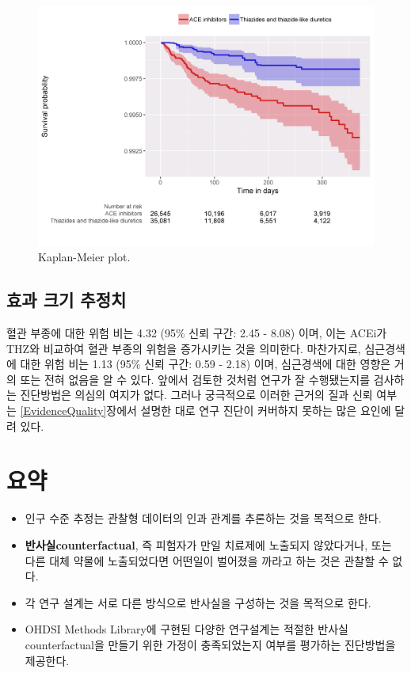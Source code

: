 \documentclass[10.5pt]{book}
\theoremstyle{definition}
\theoremstyle{definition}
\theoremstyle{definition}
\theoremstyle{remark}
\let\BeginKnitrBlock\begin \let\EndKnitrBlock\end
\begin{document}
\begin{figure}

{\centering \includegraphics[width=1\linewidth]{images/PopulationLevelEstimation/kmPlot} 

}

\caption{Kaplan-Meier plot.}\label{fig:kmPlot}
\end{figure}

\subsection{효과 크기 추정치}\label{--}

혈관 부종에 대한 위험 비는 4.32 (95\% 신뢰 구간: 2.45 - 8.08) 이며, 이는
ACEi가 THZ와 비교하여 혈관 부종의 위험을 증가시키는 것을 의미한다.
마찬가지로, 심근경색에 대한 위험 비는 1.13 (95\% 신뢰 구간: 0.59 - 2.18)
이며, 심근경색에 대한 영향은 거의 또는 전혀 없음을 알 수 있다. 앞에서
검토한 것처럼 연구가 잘 수행됐는지를 검사하는 진단방법은 의심의 여지가
없다. 그러나 궁극적으로 이러한 근거의 질과 신뢰 여부는
\ref{EvidenceQuality}장에서 설명한 대로 연구 진단이 커버하지 못하는 많은
요인에 달려 있다.

\section{요약}\label{-10}

\BeginKnitrBlock{rmdsummary}
\begin{itemize}
\item
  인구 수준 추정는 관찰형 데이터의 인과 관계를 추론하는 것을 목적으로
  한다.
\item
  \textbf{반사실counterfactual}, 즉 피험자가 만일 치료제에 노출되지
  않았다거나, 또는 다른 대체 약물에 노출되었다면 어떤일이 벌어졌을
  까라고 하는 것은 관찰할 수 없다.
\item
  각 연구 설계는 서로 다른 방식으로 반사실을 구성하는 것을 목적으로
  한다.
\item
  OHDSI Methods Library에 구현된 다양한 연구설계는 적절한
  반사실counterfactual을 만들기 위한 가정이 충족되었는지 여부를 평가하는
  진단방법을 제공한다.
\end{itemize}
\EndKnitrBlock{rmdsummary}
\end{document}
